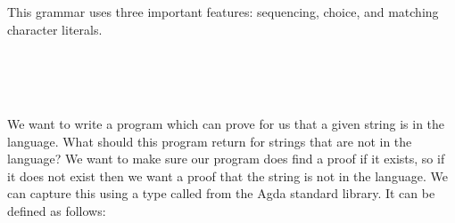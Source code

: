 This grammar uses three important features: sequencing, choice, and matching character literals.

\begin{code}[hide]%
%
\>[4]\AgdaSpace{}%
\AgdaSpace{}%
\AgdaSpace{}%
\AgdaSpace{}%
\AgdaSymbol{:}\AgdaSpace{}%
\<%
\end{code}
\begin{code}%
%
\>[4]%
\>[17]\AgdaSymbol{=}\AgdaSpace{}%
\AgdaSpace{}%
\AgdaOperator{\AgdaFunction{*}}\AgdaSpace{}%
\AgdaSpace{}%
\AgdaOperator{\AgdaFunction{*}}\AgdaSpace{}%
\<%
\\
%
\>[4]%
\>[17]\AgdaSymbol{=}\AgdaSpace{}%
\AgdaSpace{}%
\AgdaSpace{}%
\AgdaSpace{}%
\AgdaSpace{}%
\<%
\\
%
\>[4]%
\>[17]\AgdaSymbol{=}\AgdaSpace{}%
\AgdaSpace{}%
\AgdaSpace{}%
\AgdaSpace{}%
\AgdaSpace{}%
\<%
\\
%
\>[4]%
\>[17]\AgdaSymbol{=}\AgdaSpace{}%
\AgdaSpace{}%
\AgdaSpace{}%
\AgdaSpace{}%
\AgdaSpace{}%
\<%
\end{code}

We want to write a program which can prove for us that a given string is in the language. What should this program return for strings that are not in the language? We want to make sure our program does find a proof if it exists, so if it does not exist then we want a proof that the string is not in the language. We can capture this using a type called  from the Agda standard library. It can be defined as follows:

\begin{code}%
%
\>[4]\AgdaSpace{}%
\AgdaSpace{}%
\AgdaSymbol{(}\AgdaSpace{}%
\AgdaSymbol{:}\AgdaSpace{}%
\AgdaSymbol{)}\AgdaSpace{}%
\AgdaSymbol{:}\AgdaSpace{}%
\AgdaSpace{}%
\<%
\\
\>[4][@{}l@{\AgdaIndent{0}}]%
\>[8]\AgdaSpace{}%
\AgdaSymbol{:}\AgdaSpace{}%
\AgdaSpace{}%
\AgdaSpace{}%
\AgdaSpace{}%
\<%
\\
%
\>[8]\AgdaSpace{}%
\AgdaSymbol{:}\AgdaSpace{}%
\AgdaSpace{}%
\AgdaSpace{}%
\AgdaSpace{}%
\AgdaSpace{}%
\<%
\end{code}


